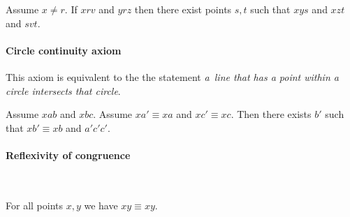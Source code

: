 \documentclass[10pt,a4paper,parskip=half,numbers=endperiod,headings=standardclasses,parskip]{scrbook}
\newcommand{\Cong}[4]{#1 #2 \equiv #3 #4}
\newcommand{\Betw}[3]{#1 #2 #3}
\newcommand{\aprime}{a'}
\newcommand{\bprime}{b'}
\newcommand{\cprime}{c'}
\begin{document}
  \begin{forthel}
    \begin{axiom}[A10]
      Assume $x \neq r$.
      If $\Betw{x}{r}{v}$ and $\Betw{y}{r}{z}$
      then there exist points $s,t$ such that
      $\Betw{x}{y}{s}$ and $\Betw{x}{z}{t}$ and $\Betw{s}{v}{t}$.
    \end{axiom}
  \end{forthel}


  \paragraph{Circle continuity axiom}
  This axiom is equivalent to the the statement
  \textit{a~line that has a point within a circle intersects that circle}.


  \begin{forthel}
    \begin{axiom}[CA]
      Assume $\Betw{x}{a}{b}$ and $\Betw{x}{b}{c}$.
      Assume
        $\Cong{x}{\aprime}{x}{a}$ and
        $\Cong{x}{\cprime}{x}{c}$.
      Then there exists $\bprime$ such that $\Cong{x}{\bprime}{x}{b}$ and $\Betw{\aprime}{\cprime}{\cprime}$.
    \end{axiom}
  \end{forthel}







  \paragraph{Reflexivity of congruence}\

  \begin{forthel}
    \begin{lemma} %
      For all points $x, y$ we have $\Cong{x}{y}{x}{y}$.
    \end{lemma}
  \end{forthel}
\end{document}
